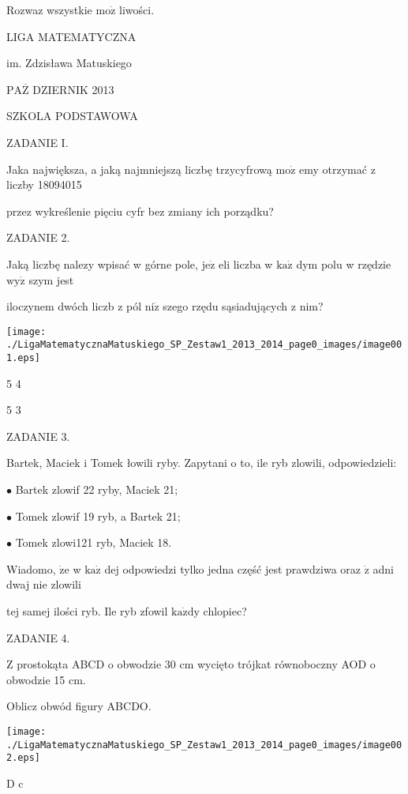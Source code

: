 \documentclass[a4paper,12pt]{article}
\begin{document}
Rozwaz wszystkie $\mathrm{m}\mathrm{o}\dot{\mathrm{z}}$ liwości.






LIGA MATEMATYCZNA

im. Zdzisława Matuskiego

$\mathrm{P}\mathrm{A}\overline{\mathrm{Z}}$ DZIERNIK 2013

SZKOLA PODSTAWOWA

ZADANIE I.

Jaka największa, a jaką najmniejszą liczbę trzycyfrową $\mathrm{m}\mathrm{o}\dot{\mathrm{z}}$ emy otrzymać z liczby 18094015

przez wykreślenie pięciu cyfr bez zmiany ich porządku?

ZADANIE 2.

Jaką liczbę nalezy wpisać w górne pole, $\mathrm{j}\mathrm{e}\dot{\mathrm{z}}$ eli liczba w $\mathrm{k}\mathrm{a}\dot{\mathrm{z}}$ dym polu w rzędzie $\mathrm{w}\mathrm{y}\dot{\mathrm{z}}$ szym jest

iloczynem dwóch liczb z pól $\mathrm{n}\mathrm{i}\dot{\mathrm{z}}$ szego rzędu sąsiadujących z nim?
\begin{center}
\texttt{[image: ./LigaMatematycznaMatuskiego\_SP\_Zestaw1\_2013\_2014\_page0\_images/image001.eps]}
\end{center}
5 4

5 3

ZADANIE 3.

Bartek, Maciek i Tomek łowili ryby. Zapytani o to, ile ryb zlowili, odpowiedzieli:

$\bullet$ Bartek zlowif 22 ryby, Maciek 21;

$\bullet$ Tomek zlowif 19 ryb, a Bartek 21;

$\bullet$ Tomek zlowi121 ryb, Maciek 18.

Wiadomo, $\dot{\mathrm{z}}\mathrm{e}$ w $\mathrm{k}\mathrm{a}\dot{\mathrm{z}}$ dej odpowiedzi tylko jedna część jest prawdziwa oraz $\dot{\mathrm{z}}$ adni dwaj nie zlowili

tej samej ilości ryb. Ile ryb zfowil $\mathrm{k}\mathrm{a}\dot{\mathrm{z}}\mathrm{d}\mathrm{y}$ chlopiec?

ZADANIE 4.

Z prostokąta ABCD o obwodzie 30 cm wycięto trójkat równoboczny AOD o obwodzie 15 cm.

Oblicz obwód figury ABCDO.
\begin{center}
\texttt{[image: ./LigaMatematycznaMatuskiego\_SP\_Zestaw1\_2013\_2014\_page0\_images/image002.eps]}
\end{center}
D  c
\end{document}
